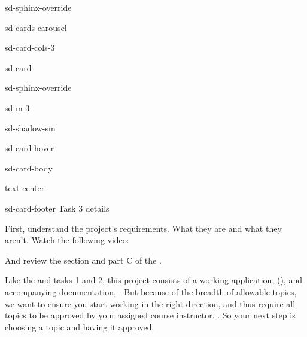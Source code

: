 \documentclass[letterpaper,10pt,english]{jupyterBook}
\begin{document}
\begin{sphinxuseclass}{sd-sphinx-override}
\begin{sphinxuseclass}{sd-cards-carousel}
\begin{sphinxuseclass}{sd-card-cols-3}
\begin{sphinxuseclass}{sd-card}
\begin{sphinxuseclass}{sd-sphinx-override}
\begin{sphinxuseclass}{sd-m-3}
\begin{sphinxuseclass}{sd-shadow-sm}
\begin{sphinxuseclass}{sd-card-hover}
\begin{sphinxuseclass}{sd-card-body}
\begin{sphinxuseclass}{text-center}
\end{sphinxuseclass}
\end{sphinxuseclass}
\begin{sphinxuseclass}{sd-card-footer}
\sphinxAtStartPar
Task 3 details 

\end{sphinxuseclass}
\end{sphinxuseclass}
\end{sphinxuseclass}
\end{sphinxuseclass}
\end{sphinxuseclass}
\end{sphinxuseclass}
\end{sphinxuseclass}
\end{sphinxuseclass}
\end{sphinxuseclass}
\begin{DUlineblock}{0em}
\item[] 
\end{DUlineblock}

\sphinxAtStartPar
First, understand the project’s requirements. What they are \sphinxhyphen{}and what they aren’t. Watch the following video:



\sphinxAtStartPar
And review the  section and part C of the .

\sphinxAtStartPar
Like the  and  tasks 1 and 2, this project consists of a working application, ({\hyperref[\detokenize{task2_c/task2_part_c:task2-part-c}]{}}), and accompanying documentation, {\hyperref[\detokenize{task2_doc/task2_doc:task2-doc}]{}}. But because of the breadth of allowable topics, we want to ensure you start working in the right direction, and thus require all topics to be approved by your assigned course instructor, {\hyperref[\detokenize{task1:task1}]{}}. So your next step is choosing a topic and having it approved.
\end{document}

